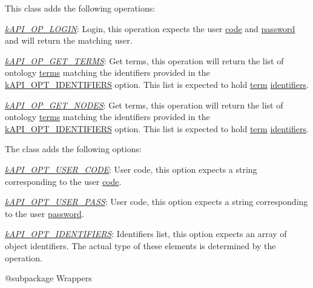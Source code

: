 This class adds the following operations\-:


\begin{DoxyItemize}
\item {\itshape \hyperlink{}{k\-A\-P\-I\-\_\-\-O\-P\-\_\-\-L\-O\-G\-I\-N}}\-: Login, this operation expects the user \hyperlink{}{code} and \hyperlink{}{password} and will return the matching user. 
\item {\itshape \hyperlink{}{k\-A\-P\-I\-\_\-\-O\-P\-\_\-\-G\-E\-T\-\_\-\-T\-E\-R\-M\-S}}\-: Get terms, this operation will return the list of ontology \hyperlink{class_c_ontology_term}{terms} matching the identifiers provided in the \hyperlink{}{k\-A\-P\-I\-\_\-\-O\-P\-T\-\_\-\-I\-D\-E\-N\-T\-I\-F\-I\-E\-R\-S} option. This list is expected to hold \hyperlink{class_c_ontology_term}{term} \hyperlink{}{identifiers}. 
\item {\itshape \hyperlink{}{k\-A\-P\-I\-\_\-\-O\-P\-\_\-\-G\-E\-T\-\_\-\-N\-O\-D\-E\-S}}\-: Get terms, this operation will return the list of ontology \hyperlink{class_c_ontology_term}{terms} matching the identifiers provided in the \hyperlink{}{k\-A\-P\-I\-\_\-\-O\-P\-T\-\_\-\-I\-D\-E\-N\-T\-I\-F\-I\-E\-R\-S} option. This list is expected to hold \hyperlink{class_c_ontology_term}{term} \hyperlink{}{identifiers}. 
\end{DoxyItemize}

The class adds the following options\-:


\begin{DoxyItemize}
\item {\itshape \hyperlink{}{k\-A\-P\-I\-\_\-\-O\-P\-T\-\_\-\-U\-S\-E\-R\-\_\-\-C\-O\-D\-E}}\-: User code, this option expects a string corresponding to the user \hyperlink{class_c_coded_unit_object_a56af949800e65f9a283239d2e455259f}{code}. 
\item {\itshape \hyperlink{}{k\-A\-P\-I\-\_\-\-O\-P\-T\-\_\-\-U\-S\-E\-R\-\_\-\-P\-A\-S\-S}}\-: User code, this option expects a string corresponding to the user \hyperlink{class_c_user_a0e6f1cf51ad23f971ed0999f8d248c8d}{password}. 
\item {\itshape \hyperlink{}{k\-A\-P\-I\-\_\-\-O\-P\-T\-\_\-\-I\-D\-E\-N\-T\-I\-F\-I\-E\-R\-S}}\-: Identifiers list, this option expects an array of object identifiers. The actual type of these elements is determined by the operation. 
\end{DoxyItemize}

\begin{DoxyVerb}    @subpackage     Wrappers\end{DoxyVerb}



